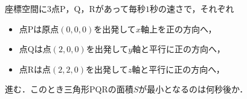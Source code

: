 座標空間に$3$点$\mathrm{P}$，$\mathrm{Q}$，$\mathrm{R}$があって毎秒$1$秒の速さで，それぞれ
\begin{itemize}
  \item 点$\mathrm{P}$は原点$(0,0,0)$を出発して$x$軸上を正の方向へ，
  \item 点$\mathrm{Q}$は点$(2,0,0)$を出発して$y$軸と平行に正の方向へ，
  \item 点$\mathrm{R}$は点$(2,2,0)$を出発して$z$軸と平行に正の方向へ，
\end{itemize}
進む．このとき三角形$\mathrm{PQR}$の面積$S$が最小となるのは何秒後か．
